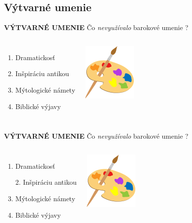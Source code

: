 \documentclass[dvipsnames]{beamer}
\begin{document}
\begin{frame}
	\subsection{Výtvarné umenie}
	\textbf{VÝTVARNÉ UMENIE}
	\vskip 3mm
	Čo \textit{nevyužívalo} barokové umenie ?
	\begin{columns}
		\begin{enumerate}
			\item Dramatickosť
			\item Inšpiráciu antikou
			\item Mýtologické námety
			\item Biblické výjavy
		\end{enumerate}
		\includegraphics[scale=1]{palette}

	\end{columns}
\end{frame}
\begin{frame}
	\textbf{VÝTVARNÉ UMENIE}
	\vskip 3mm
	Čo \textit{nevyužívalo} barokové umenie ?
	\begin{columns}
		\column{0.5\textwidth}
		\begin{enumerate}
			\item Dramatickosť
			\item[\textcolor{g}{2.}] \textcolor{g}{Inšpiráciu antikou} \setcounter{enumi}{2}
			\item Mýtologické námety
			\item Biblické výjavy
		\end{enumerate}
		\column{0.5\textwidth}
		\includegraphics[scale=1]{palette}

	\end{columns}
\end{frame}
\end{document}
